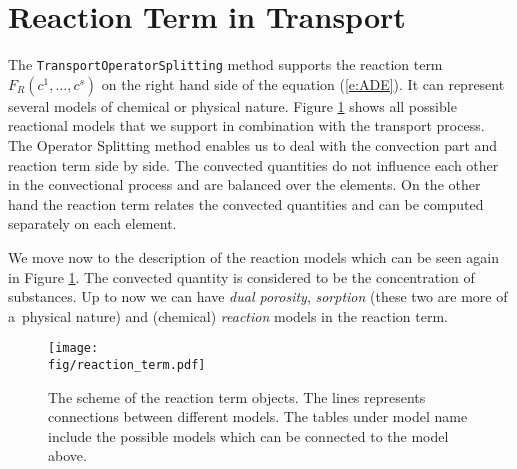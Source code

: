 \def\abs#1{\lvert#1\rvert}
\def\argdot{{\hspace{0.18em}\cdot\hspace{0.18em}}}
\def\avg#1{\left\{#1\right\}_\omega}
\def\D{{\tn D}}
\def\div{\operatorname{div}}
\def\Eh{\mathcal E_h}       %
\def\Ehcom{\mathcal E_{h,C}}         %
\def\Ehdir{\mathcal E_{h,D}}         %
\def\Ehint{\mathcal E_{h,I}}       %
\def\grad{\nabla}
\def\jmp#1{[#1]}
\def\n{\vc n}
\def\vc#1{\mathbf{\boldsymbol{#1}}}     %
\def\R{\mathbb R}
\def\sc#1#2{\left(#1,#2\right)}
\def\Th{\mathcal T_h}       %
\def\th{\vartheta}
\def\tn#1{{\mathbb{#1}}}    %
\def\Tr{\operatorname{Tr}}
\def\where{\,|\,}

\section{Reaction Term in Transport}
\label{sec:reaction_term}

The {\tt TransportOperatorSplitting} method supports the reaction term $F_R(c^1,\ldots,c^s)$ on the right hand side of the equation (\ref{e:ADE}).
It can represent several models of chemical or physical nature. 
Figure \ref{fig:reaction_term} shows all possible reactional models that we support in combination with the transport process. The Operator Splitting method enables 
us to deal with the convection part and reaction term side by side. The convected quantities do not influence each other in the convectional
process and are balanced over the elements. On the other hand the reaction term relates the convected quantities and can be computed 
separately on each element.

We move now to the description of the reaction models which can be seen again in Figure \ref{fig:reaction_term}. 
The convected quantity is considered to be the concentration of substances. 
Up to now we can have \emph{dual porosity}, \emph{sorption} (these two are more of a~physical nature) and (chemical) \emph{reaction} models in the reaction term. 

\begin{figure}
  \centering
  \texttt{[image: \\fig/reaction\_term.pdf]}
  \caption{The scheme of the reaction term objects. The lines represents connections between different models. 
  The tables under model name include the possible models which can be connected to the model above.}
  \label{fig:reaction_term}
\end{figure}

